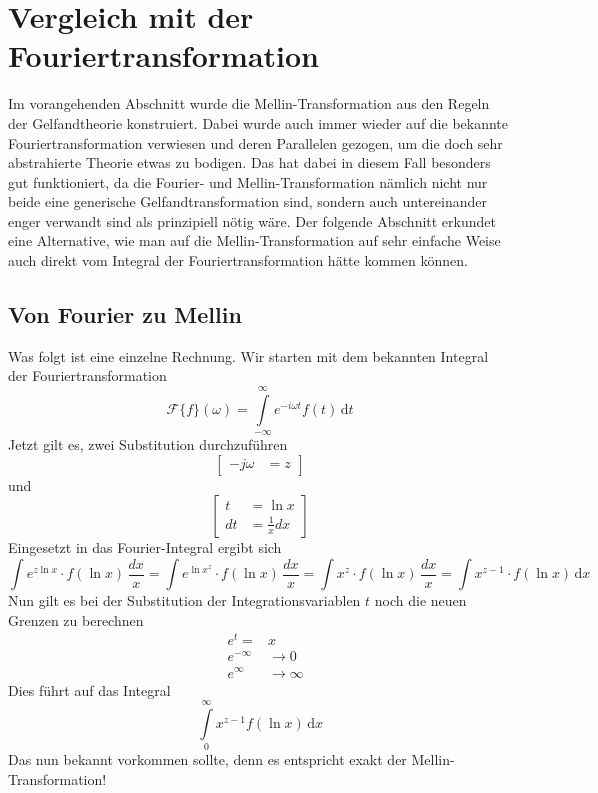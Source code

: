 %
%
%
%
\section{Vergleich mit der Fouriertransformation
\label{mellin:section:teil3}}
Im vorangehenden Abschnitt wurde die Mellin-Transformation aus den Regeln der Gelfandtheorie konstruiert. 
Dabei wurde auch immer wieder auf die bekannte Fouriertransformation verwiesen und deren Parallelen gezogen, um die doch sehr abstrahierte 
Theorie etwas zu bodigen.
Das hat dabei in diesem Fall besonders gut funktioniert, da die Fourier- und Mellin-Transformation nämlich nicht nur beide eine generische 
Gelfandtransformation sind, sondern auch untereinander enger verwandt sind als prinzipiell nötig wäre.
Der folgende Abschnitt erkundet eine Alternative, wie man auf die Mellin-Transformation auf sehr einfache Weise auch direkt vom Integral 
der Fouriertransformation hätte kommen können.

\subsection{Von Fourier zu Mellin
\label{mellin:subsection:foumel}}
Was folgt ist eine einzelne Rechnung.
Wir starten mit dem bekannten Integral der Fouriertransformation
\begin{equation}
    \mathcal{F}\{f \}(\omega) = \int\limits_{-\infty}^{\infty} e^{-i\omega{}t} f(t) \,\mathrm{d}t
    \label{mellin:fourier}
\end{equation}
Jetzt gilt es, zwei Substitution durchzuführen
\[
    \left[
    \begin{aligned}
        -j\omega &= z
    \end{aligned}
    \right]
\]
und
\[
    \left[
    \begin{aligned}
        t &= \ln x \\
        dt &= \frac{1}{x} dx
    \end{aligned}
    \right]
\]
Eingesetzt in das Fourier-Integral ergibt sich
\[
    \int e^{z \ln x} \cdot f(\ln x) \,\frac{dx}{x} = \int e^{\ln x^z} \cdot f(\ln x) \,\frac{dx}{x}
    = \int x^{z} \cdot f(\ln x) \,\frac{dx}{x} = \int x^{z-1} \cdot f(\ln x) \,\mathrm{d}x
\]
Nun gilt es bei der Substitution der Integrationsvariablen $t$ noch die neuen Grenzen zu berechnen
\[
    \begin{aligned}
        &e^{t} =& x \\
        &e^{-\infty} &\rightarrow 0 \\
        &e^{\infty} &\rightarrow \infty 
    \end{aligned}
\]
Dies führt auf das Integral
\[
    \int\limits_{0}^{\infty} x^{z-1} f(\ln x) \,\mathrm{d}x
\]
Das nun bekannt vorkommen sollte, denn es entspricht exakt der Mellin-Transformation!

